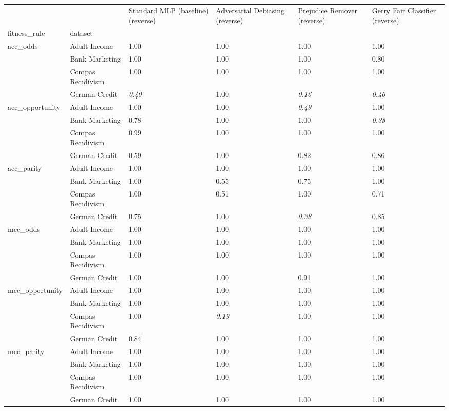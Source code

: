 \begin{tabular}{llllll}
\toprule
 &  & Standard MLP (baseline) (reverse) & Adversarial Debiasing (reverse) & Prejudice Remover (reverse) & Gerry Fair Classifier (reverse) \\
fitness_rule & dataset &  &  &  &  \\
\midrule
\multirow[t]{4}{*}{acc_odds} & Adult Income & 1.00 & 1.00 & 1.00 & 1.00 \\
 & Bank Marketing & 1.00 & 1.00 & 1.00 & 0.80 \\
 & Compas Recidivism & 1.00 & 1.00 & 1.00 & 1.00 \\
 & German Credit & \textit{0.40} & 1.00 & \textit{0.16} & \textit{0.46} \\
\cline{1-6}
\multirow[t]{4}{*}{acc_opportunity} & Adult Income & 1.00 & 1.00 & \textit{0.49} & 1.00 \\
 & Bank Marketing & 0.78 & 1.00 & 1.00 & \textit{0.38} \\
 & Compas Recidivism & 0.99 & 1.00 & 1.00 & 1.00 \\
 & German Credit & 0.59 & 1.00 & 0.82 & 0.86 \\
\cline{1-6}
\multirow[t]{4}{*}{acc_parity} & Adult Income & 1.00 & 1.00 & 1.00 & 1.00 \\
 & Bank Marketing & 1.00 & 0.55 & 0.75 & 1.00 \\
 & Compas Recidivism & 1.00 & 0.51 & 1.00 & 0.71 \\
 & German Credit & 0.75 & 1.00 & \textit{0.38} & 0.85 \\
\cline{1-6}
\multirow[t]{4}{*}{mcc_odds} & Adult Income & 1.00 & 1.00 & 1.00 & 1.00 \\
 & Bank Marketing & 1.00 & 1.00 & 1.00 & 1.00 \\
 & Compas Recidivism & 1.00 & 1.00 & 1.00 & 1.00 \\
 & German Credit & 1.00 & 1.00 & 0.91 & 1.00 \\
\cline{1-6}
\multirow[t]{4}{*}{mcc_opportunity} & Adult Income & 1.00 & 1.00 & 1.00 & 1.00 \\
 & Bank Marketing & 1.00 & 1.00 & 1.00 & 1.00 \\
 & Compas Recidivism & 1.00 & \textit{0.19} & 1.00 & 1.00 \\
 & German Credit & 0.84 & 1.00 & 1.00 & 1.00 \\
\cline{1-6}
\multirow[t]{4}{*}{mcc_parity} & Adult Income & 1.00 & 1.00 & 1.00 & 1.00 \\
 & Bank Marketing & 1.00 & 1.00 & 1.00 & 1.00 \\
 & Compas Recidivism & 1.00 & 1.00 & 1.00 & 1.00 \\
 & German Credit & 1.00 & 1.00 & 1.00 & 1.00 \\
\cline{1-6}
\bottomrule
\end{tabular}
